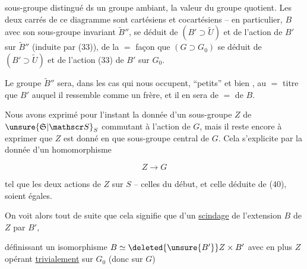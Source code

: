 
sous-groupe distingué ds un groupe ambiant, la valeur du groupe quotient. Les deux carrés de ce diagramme sont cartésiens et cocartésiens -- en particulier, $B$ avec son sous-groupe invariant  $\widetilde B''$, se déduit de $(B'\supset\widetilde U)$ et de l'action de $B'$ sur $\widetilde B''$ (induite par (33)), de la $=$ façon que $(G\supset G_0)$ se déduit de $(B'\supset\widetilde U)$ et de l'action (33) de $B'$ sur $G_0$.

Le groupe $\widetilde B''$  sera, dans les cas qui nous occupent, ``petits'' et bien  , au $=$ titre que $B'$ auquel il ressemble comme un frère, et il en sera de $=$ de $B$.

Nous avons exprimé pour l'instant  la donnée d'un sous-groupe $Z$ de $\unsure{\mathfrak S|\mathscr S}_S$ commutant à l'action de $G$, mais il reste encore à exprimer que $Z$ est donné en  que sous-groupe central de $G$. Cela s'explicite par la donnée d'un homomorphisme 

\[ Z\longrightarrow G \tag*{(40)} \]

tel que les deux actions de $Z$ sur $S$ -- celles du début, et celle déduite de (40), soient égales.

On voit alors tout de suite que cela signifie que   d'un \uline{scindage}   de l'extension $B$ de $Z$ par $B'$, 


définissant  un isomorphisme $B\simeq\deleted{\unsure{B'}}Z\times B'$ avec en plus $Z$ opérant \uline{trivialement} sur $G_0$ (donc sur $G$)

